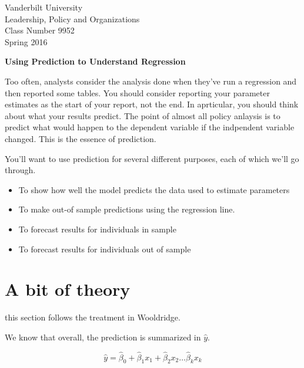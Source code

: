 \documentclass[12pt]{article}
\begin{document}
\thispagestyle{empty}%

\setlength{\parskip}{1ex plus 0.5ex minus 0.2ex}

\setcounter{secnumdepth}{-2}

\begin{flushleft}
Vanderbilt University\\Leadership, Policy and Organizations\\Class Number 9952\\ Spring 2016\\
\end{flushleft}

\begin{center}
  \textbf{Using Prediction to Understand Regression}
\end{center}


Too often, analysts consider the analysis done when they've run a
regression and then reported some tables. You should consider
reporting your parameter estimates as the start of your report, not
the end. In aprticular, you should think about what your results
predict. The point of almost all policy anlaysis is to predict what
would happen to the dependent variable if the indpendent variable
changed. This is the essence of prediction. 

You'll want to use prediction for several different purposes, each of
which we'll go through.

\begin{itemize}
\item To show how well the model predicts the data used to estimate
  parameters
\item To make out-of sample predictions using the regression line.
\item To forecast results for individuals in sample
\item To forecast results for individuals out of sample
\end{itemize}



\section{A bit of theory}
\label{sec:bit-theory}

this section follows the treatment in Wooldridge. 

We know that overall, the prediction is summarized in $\hat{y}$. 

\begin{equation*}
  \hat{y}=\hat{\beta}_0+\hat{\beta}_1 x_1+ \hat{\beta}_2 x_2 \ldots \hat{\beta}_k x_k
\end{equation*}
\end{document}
